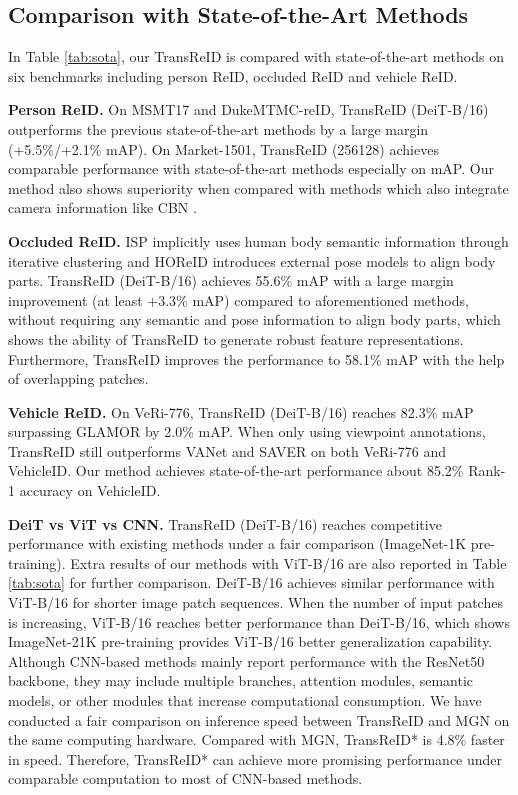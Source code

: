 \documentclass[10pt,twocolumn,letterpaper]{article}
\begin{document}
\subsection{Comparison with State-of-the-Art Methods}
In Table \ref{tab:sota}, our TransReID is compared with state-of-the-art methods on six benchmarks including person ReID, occluded ReID and vehicle ReID. 

\textbf{Person ReID.} 
On MSMT17 and DukeMTMC-reID, TransReID (DeiT-B/16) outperforms the previous state-of-the-art methods by a large margin (+5.5\%/+2.1\% mAP). On Market-1501, TransReID (256128) achieves comparable performance with state-of-the-art methods especially on mAP. Our method also shows superiority when compared with methods which also integrate camera information like CBN \cite{camera-bn}.

\textbf{Occluded ReID.} ISP implicitly uses human body semantic information through iterative clustering and HOReID introduces external pose models to align body parts. TransReID (DeiT-B/16) achieves 55.6\% mAP with a large margin improvement (at least +3.3\% mAP) compared to aforementioned methods, without requiring any semantic and pose information to align body parts, which shows the ability of TransReID to generate robust feature representations. Furthermore, TransReID improves the performance to 58.1\% mAP with the help of overlapping patches.

\textbf{Vehicle ReID.} On VeRi-776, TransReID (DeiT-B/16) reaches 82.3\% mAP surpassing GLAMOR by 2.0\% mAP. When only using viewpoint annotations, TransReID still outperforms VANet and SAVER on both VeRi-776 and VehicleID. Our method achieves state-of-the-art performance about 85.2\% Rank-1 accuracy on VehicleID.

\textbf{DeiT vs ViT vs CNN.} TransReID (DeiT-B/16) reaches competitive performance with existing methods under a fair comparison (ImageNet-1K pre-training). Extra results of our methods with ViT-B/16 are also reported in Table \ref{tab:sota} for further comparison. DeiT-B/16 achieves similar performance with ViT-B/16 for shorter image patch sequences. When the number of input patches is increasing, ViT-B/16 reaches better performance than DeiT-B/16, which shows ImageNet-21K pre-training provides ViT-B/16 better generalization capability.  Although CNN-based methods mainly report performance with the ResNet50 backbone, they may include multiple branches, attention modules, semantic models, or other modules that increase computational consumption. 
We have conducted a fair comparison on inference speed between TransReID and MGN \cite{MGN} on the same computing hardware. Compared with MGN, TransReID* is 4.8\% faster in speed.
Therefore, TransReID* can achieve more promising performance under comparable computation to most of CNN-based methods. 
 
\end{document}
